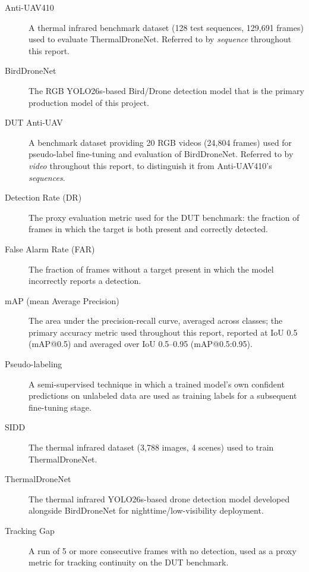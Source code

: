 \documentclass[12pt,a4paper]{report}
\begin{document}
\begin{description}
  \item[Anti-UAV410] A thermal infrared benchmark dataset (128 test
        sequences, 129,691 frames) used to evaluate ThermalDroneNet.
        Referred to by \emph{sequence} throughout this report.
  \item[BirdDroneNet] The RGB YOLO26s-based Bird/Drone detection model
        that is the primary production model of this project.
  \item[DUT Anti-UAV] A benchmark dataset providing 20 RGB videos
        (24,804 frames) used for pseudo-label fine-tuning and evaluation
        of BirdDroneNet. Referred to by \emph{video} throughout this
        report, to distinguish it from Anti-UAV410's \emph{sequences}.
  \item[Detection Rate (DR)] The proxy evaluation metric used for the
        DUT benchmark: the fraction of frames in which the target is
        both present and correctly detected.
  \item[False Alarm Rate (FAR)] The fraction of frames without a target
        present in which the model incorrectly reports a detection.
  \item[mAP (mean Average Precision)] The area under the precision-recall
        curve, averaged across classes; the primary accuracy metric used
        throughout this report, reported at IoU 0.5 (mAP@0.5) and
        averaged over IoU 0.5--0.95 (mAP@0.5:0.95).
  \item[Pseudo-labeling] A semi-supervised technique in which a trained
        model's own confident predictions on unlabeled data are used as
        training labels for a subsequent fine-tuning stage.
  \item[SIDD] The thermal infrared dataset (3,788 images, 4 scenes) used
        to train ThermalDroneNet.
  \item[ThermalDroneNet] The thermal infrared YOLO26s-based drone
        detection model developed alongside BirdDroneNet for
        nighttime/low-visibility deployment.
  \item[Tracking Gap] A run of 5 or more consecutive frames with no
        detection, used as a proxy metric for tracking continuity on the
        DUT benchmark.
\end{description}
\end{document}
